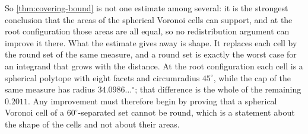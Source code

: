 \documentclass[11pt,reqno]{amsart}
\renewcommand{\_}{\origunderscore\allowbreak}
\numberwithin{equation}{section}
\theoremstyle{plain}
\theoremstyle{definition}
\theoremstyle{remark}
\begin{document}
So \cref{thm:covering-bound} is not one estimate among several: it is
the strongest conclusion that the areas of the spherical Voronoi cells
can support, and at the root configuration those areas are all equal, so
no redistribution argument can improve it there. What the estimate gives
away is shape. It replaces each cell by the round set of the same
measure, and a round set is exactly the worst case for an integrand that
grows with the distance. At the root configuration each cell is a
spherical polytope with eight facets and circumradius $45^\circ$, while
the cap of the same measure has radius $34.0986\ldots^\circ$; that
difference is the whole of the remaining $0.2011$. Any improvement must
therefore begin by proving that a spherical Voronoi cell of a
$60^\circ$-separated set cannot be round, which is a statement about the
shape of the cells and not about their areas.
\end{document}
